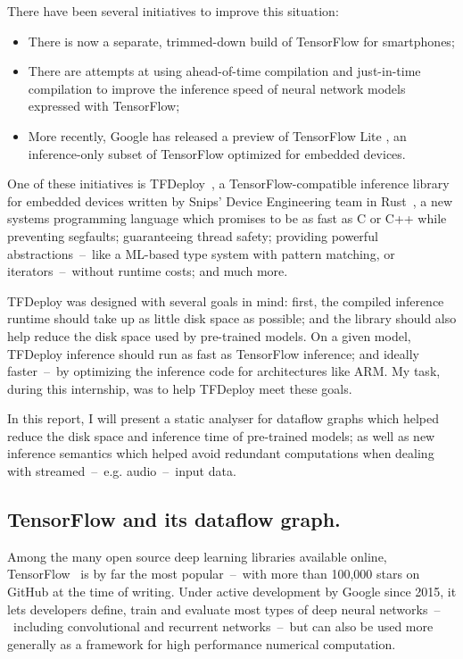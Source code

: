 \documentclass[11pt]{article}
\begin{document}
There have been several initiatives to improve this situation:
\begin{itemize}[noitemsep]
    \item There is now a separate, trimmed-down build of TensorFlow \cite{tensorflow-mobile} for smartphones;
    \item There are attempts at using ahead-of-time compilation \cite{tensorflow-aot} and just-in-time compilation \cite{tensorflow-jit} to improve the inference speed of neural network models expressed with TensorFlow;
    \item More recently, Google has released a preview of TensorFlow Lite \cite{tensorflow-lite}, an inference-only subset of TensorFlow optimized for embedded devices.
\end{itemize}

One of these initiatives is TFDeploy~\cite{tfdeploy}, a TensorFlow-compatible inference library for embedded devices written by Snips' Device Engineering team in Rust~\cite{rust}, a new systems programming language which promises to be as fast as C or C++ while preventing segfaults; guaranteeing thread safety; providing powerful abstractions~--~like a ML-based type system with pattern matching, or iterators~--~without runtime costs; and much more.

TFDeploy was designed with several goals in mind: first, the compiled inference runtime should take up as little disk space as possible; and the library should also help reduce the disk space used by pre-trained models. On a given model, TFDeploy inference should run as fast as TensorFlow inference; and ideally faster~--~by optimizing the inference code for architectures like ARM. My task, during this internship, was to help TFDeploy meet these goals. 

In this report, I will present a static analyser for dataflow graphs which helped reduce the disk space and inference time of pre-trained models; as well as new inference semantics which helped avoid redundant computations when dealing with streamed~--~e.g. audio~--~input data.

\newpage
\subsection*{TensorFlow and its dataflow graph.}

Among the many open source deep learning libraries available online, TensorFlow~\cite{tensorflow} is by far the most popular~--~with more than 100,000 stars on GitHub at the time of writing. Under active development by Google since 2015, it lets developers define, train and evaluate most types of deep neural networks~--~including convolutional and recurrent networks~--~but can also be used more generally as a framework for high performance numerical computation.
\end{document}
